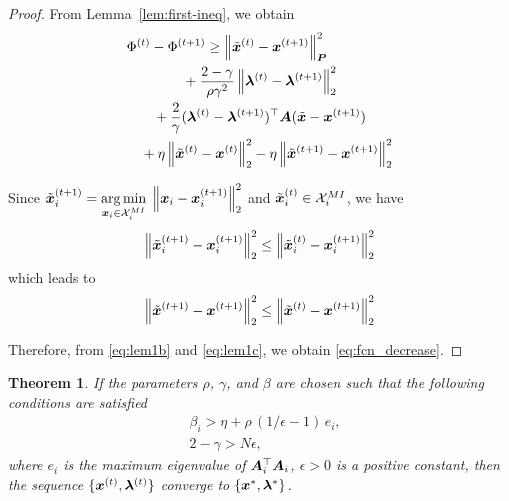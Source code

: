 \documentclass[twocolumn,amsthm]{autart}%
\theoremstyle{definition}
\theoremstyle{plain}
\newtheorem{theorem}{Theorem}
\begin{document}
\begin{proof}
From Lemma~\ref{lem:first-ineq}, we obtain
\begin{equation}
\label{eq:lem1b}
\begin{multlined}
\Phi^{(t)} - \Phi^{(t+1)} 
\ge \norm{\xtil^{(t)}-\bbsym{x}^{(t+1)}}_{\bbsym{P}}^2  \\
+ \frac{2-\gamma}{\rho \gamma^2} \norm{\bbsym{\lambda}^{(t)}-\bbsym{\lambda}^{(t+1)}}_2^2 \\
+ \frac{2}{\gamma} (\bbsym{\lambda}^{(t)}-\bbsym{\lambda}^{(t+1)})^\top \bbsym{A} (\xtil-\bbsym{x}^{(t+1)}) \\
+ \eta \norm{\xtil^{(t)}-\bbsym{x}^{(t)}}_2^2 - \eta \norm{\xtil^{(t+1)}-\bbsym{x}^{(t+1)}}_2^2 
\end{multlined}
\end{equation}

Since $\Tilde{\boldsymbol{x}}_i^{(t+1)} = \underset{\boldsymbol{x}_i \in \mathcal{X}_i^{\relax{MI}}}{\operatorname*{arg\,min}} \;\left\lVert \boldsymbol{x}_i - \boldsymbol{x}_i^{(t+1)} \right\rVert_2^2$ and $\Tilde{\boldsymbol{x}}_i^{(t)} \in \mathcal{X}_i^{\relax{MI}}$, we have
\begin{equation}
\left\lVert \Tilde{\boldsymbol{x}}_i^{(t+1)} - \boldsymbol{x}_i^{(t+1)} \right\rVert_2^2 
\le \left\lVert \Tilde{\boldsymbol{x}}_i^{(t)} - \boldsymbol{x}_i^{(t+1)} \right\rVert_2^2 
\end{equation}
which leads to
\begin{equation}
\label{eq:lem1c}
\left\lVert \Tilde{\boldsymbol{x}}^{(t+1)} - \boldsymbol{x}^{(t+1)} \right\rVert_2^2 
\le \left\lVert \Tilde{\boldsymbol{x}}^{(t)} - \boldsymbol{x}^{(t+1)} \right\rVert_2^2 
\end{equation}

Therefore, from \eqref{eq:lem1b} and \eqref{eq:lem1c}, we obtain \eqref{eq:fcn_decrease}.
\end{proof}

\begin{theorem}
If the parameters $\rho$, $\gamma$, and $\beta$ are chosen such that the following conditions are satisfied
\begin{equation}
\label{eq:conditions}
\begin{split}
& \beta_i > \eta + \rho\, (1/\epsilon-1)\, e_i, \\
& 2-\gamma > N \epsilon,
\end{split}
\end{equation}
where $e_i$ is the maximum eigenvalue of $\boldsymbol{A}_i^\top \boldsymbol{A}_i$, $\epsilon > 0$ is a positive constant,
then the sequence $\{\boldsymbol{x}^{(t)} , \boldsymbol{\lambda}^{(t)}\}$ converge to $\{\boldsymbol{x}^{*} , \boldsymbol{\lambda}^{*} \}$.
\end{theorem}
\end{document}
